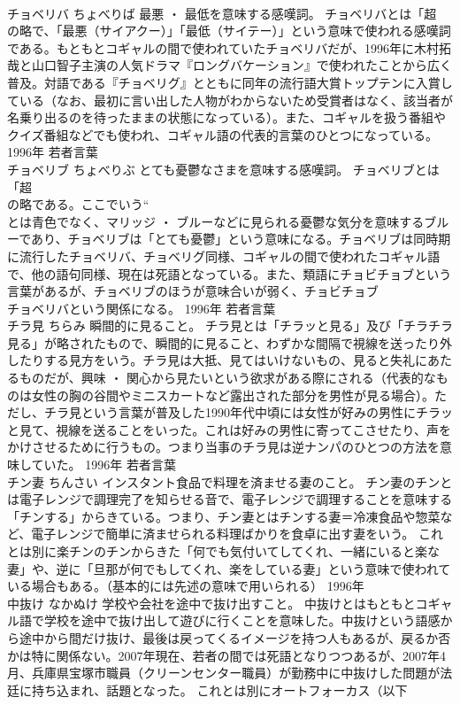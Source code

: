 \documentclass[8pt]{extreport}
\begin{document}
\begin{CJK}{UTF8}{min}
\\	チョベリバ	ちょべりば	最悪 ・ 最低を意味する感嘆詞。	チョベリバとは「超 
\\	の略で、「最悪（サイアクー）」「最低（サイテー）」という意味で使われる感嘆詞である。もともとコギャルの間で使われていたチョベリバだが、1996年に木村拓哉と山口智子主演の人気ドラマ『ロングバケーション』で使われたことから広く普及。対語である『チョベリグ』とともに同年の流行語大賞トップテンに入賞している（なお、最初に言い出した人物がわからないため受賞者はなく、該当者が名乗り出るのを待ったままの状態になっている）。また、コギャルを扱う番組やクイズ番組などでも使われ、コギャル語の代表的言葉のひとつになっている。	1996年	若者言葉	
\\	チョベリブ	ちょべりぶ	とても憂鬱なさまを意味する感嘆詞。	チョベリブとは「超 
\\	の略である。ここでいう“
\\	とは青色でなく、マリッジ ・ ブルーなどに見られる憂鬱な気分を意味するブルーであり、チョベリブは「とても憂鬱」という意味になる。チョベリブは同時期に流行したチョベリバ、チョベリグ同様、コギャルの間で使われたコギャル語で、他の語句同様、現在は死語となっている。また、類語にチョビチョブという言葉があるが、チョベリブのほうが意味合いが弱く、チョビチョブ
\\	チョベリバという関係になる。	1996年	若者言葉	
\\	チラ見	ちらみ	瞬間的に見ること。	チラ見とは「チラッと見る」及び「チラチラ見る」が略されたもので、瞬間的に見ること、わずかな間隔で視線を送ったり外したりする見方をいう。チラ見は大抵、見てはいけないもの、見ると失礼にあたるものだが、興味 ・ 関心から見たいという欲求がある際にされる（代表的なものは女性の胸の谷間やミニスカートなど露出された部分を男性が見る場合）。ただし、チラ見という言葉が普及した1990年代中頃には女性が好みの男性にチラッと見て、視線を送ることをいった。これは好みの男性に寄ってこさせたり、声をかけさせるために行うもの。つまり当事のチラ見は逆ナンパのひとつの方法を意味していた。	1996年	若者言葉	
\\	チン妻	ちんさい	インスタント食品で料理を済ませる妻のこと。	チン妻のチンとは電子レンジで調理完了を知らせる音で、電子レンジで調理することを意味する「チンする」からきている。つまり、チン妻とはチンする妻＝冷凍食品や惣菜など、電子レンジで簡単に済ませられる料理ばかりを食卓に出す妻をいう。 これとは別に楽チンのチンからきた「何でも気付いてしてくれ、一緒にいると楽な妻」や、逆に「旦那が何でもしてくれ、楽をしている妻」という意味で使われている場合もある。（基本的には先述の意味で用いられる）	1996年	
\\	中抜け	なかぬけ	学校や会社を途中で抜け出すこと。	中抜けとはもともとコギャル語で学校を途中で抜け出して遊びに行くことを意味した。中抜けという語感から途中から間だけ抜け、最後は戻ってくるイメージを持つ人もあるが、戻るか否かは特に関係ない。2007年現在、若者の間では死語となりつつあるが、2007年4月、兵庫県宝塚市職員（クリーンセンター職員）が勤務中に中抜けした問題が法廷に持ち込まれ、話題となった。 これとは別にオートフォーカス（以下

\end{CJK}
\end{document}
